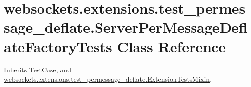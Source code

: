 \hypertarget{classwebsockets_1_1extensions_1_1test__permessage__deflate_1_1_server_per_message_deflate_factory_tests}{}\section{websockets.\+extensions.\+test\+\_\+permessage\+\_\+deflate.\+Server\+Per\+Message\+Deflate\+Factory\+Tests Class Reference}
\label{classwebsockets_1_1extensions_1_1test__permessage__deflate_1_1_server_per_message_deflate_factory_tests}


Inherits Test\+Case, and \hyperlink{classwebsockets_1_1extensions_1_1test__permessage__deflate_1_1_extension_tests_mixin}{websockets.\+extensions.\+test\+\_\+permessage\+\_\+deflate.\+Extension\+Tests\+Mixin}.

